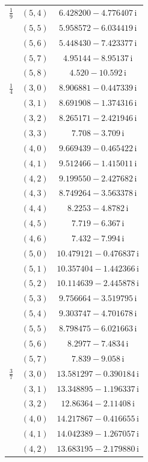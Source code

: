 \begin{table}[H]
\begin{minipage}[t]{0.325\textwidth}
\begin{tabular}[t]{|c|c|c|}
\hline
$\tfrac19$ & $(5,4)$ & $6.428200-4.776407\,\mathrm{i}$ \\
 & $(5,5)$ & $5.958572-6.034419\,\mathrm{i}$ \\
 & $(5,6)$ & $5.448430-7.423377\,\mathrm{i}$ \\
 & $(5,7)$ & $4.95144-8.95137\,\mathrm{i}$ \\
 & $(5,8)$ & $4.520-10.592\,\mathrm{i}$ \\
\hline
$\tfrac14$ & $(3,0)$ & $8.906881-0.447339\,\mathrm{i}$ \\
 & $(3,1)$ & $8.691908-1.374316\,\mathrm{i}$ \\
 & $(3,2)$ & $8.265171-2.421946\,\mathrm{i}$ \\
 & $(3,3)$ & $7.708-3.709\,\mathrm{i}$ \\
 & $(4,0)$ & $9.669439-0.465422\,\mathrm{i}$ \\
 & $(4,1)$ & $9.512466-1.415011\,\mathrm{i}$ \\
 & $(4,2)$ & $9.199550-2.427682\,\mathrm{i}$ \\
 & $(4,3)$ & $8.749264-3.563378\,\mathrm{i}$ \\
 & $(4,4)$ & $8.2253-4.8782\,\mathrm{i}$ \\
 & $(4,5)$ & $7.719-6.367\,\mathrm{i}$ \\
 & $(4,6)$ & $7.432-7.994\,\mathrm{i}$ \\
 & $(5,0)$ & $10.479121-0.476837\,\mathrm{i}$ \\
 & $(5,1)$ & $10.357404-1.442366\,\mathrm{i}$ \\
 & $(5,2)$ & $10.114639-2.445878\,\mathrm{i}$ \\
 & $(5,3)$ & $9.756664-3.519795\,\mathrm{i}$ \\
 & $(5,4)$ & $9.303747-4.701678\,\mathrm{i}$ \\
 & $(5,5)$ & $8.798475-6.021663\,\mathrm{i}$ \\
 & $(5,6)$ & $8.2977-7.4834\,\mathrm{i}$ \\
 & $(5,7)$ & $7.839-9.058\,\mathrm{i}$ \\
\hline
$\tfrac37$ & $(3,0)$ & $13.581297-0.390184\,\mathrm{i}$ \\
 & $(3,1)$ & $13.348895-1.196337\,\mathrm{i}$ \\
 & $(3,2)$ & $12.86364-2.11408\,\mathrm{i}$ \\
 & $(4,0)$ & $14.217867-0.416655\,\mathrm{i}$ \\
 & $(4,1)$ & $14.042389-1.267057\,\mathrm{i}$ \\
 & $(4,2)$ & $13.683195-2.179880\,\mathrm{i}$ \\

\end{tabular}
\end{minipage}
\end{table}
